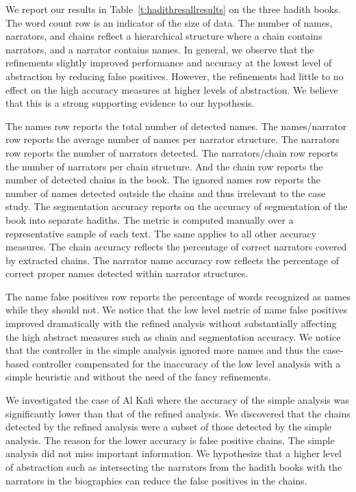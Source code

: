 \documentclass[11pt,letterpaper]{article}
\begin{document}
We report our results in Table~\ref{t:hadithresallresults} on the three hadith books.
The word count row is an indicator of the size of data.
The number of names, narrators, and chains reflect a hierarchical structure where a chain contains
narrators, and a narrator contains names.
In general, we observe that the refinements slightly improved performance and accuracy at
the lowest level of abstraction by reducing false positives.
However, the refinements had little to no effect on the high accuracy measures at higher
levels of abstraction.
We believe that this is a strong supporting evidence to our hypothesis.

The names row reports the total number of detected names. The names/narrator row reports the average
number of names per narrator structure. The narrators row reports the number of narrators detected.
The narrators/chain row reports the number of narrators per chain structure. And the chain row reports
the number of detected chains in the book.
The ignored names row reports the number of names detected outside the chains and thus irrelevant to
the case study.
The segmentation accuracy reports on the accuracy of segmentation of the book into separate hadiths.
The metric is computed manually over a representative sample of each text. The same applies to all other accuracy measures.
The chain accuracy reflects the percentage of correct narrators covered by extracted chains.
The narrator name accuracy row reflects the percentage of correct proper names detected within
narrator structures.

The name false positives row reports the percentage of words recognized as names while they should not.
We notice that the low level metric of name false positives improved dramatically with the refined
analysis without substantially affecting the high abstract measures such as chain and segmentation
accuracy.
We notice that the controller in the simple analysis ignored more names and thus the case-based
controller compensated for the inaccuracy of the low level analysis with a simple heuristic and
without the need of the fancy refinements.

We investigated the case of Al Kafi where the accuracy of the simple analysis was significantly lower than that of the refined
analysis. We  discovered that the chains detected by the refined analysis were a subset of those detected by the simple
analysis. 
The reason for the lower accuracy is false positive chains. 
The simple analysis did not miss important information. 
We hypothesize that a higher level of abstraction such as intersecting the narrators from the hadith books with the narrators 
in the biographies can reduce the false positives in the chains.
\end{document}
